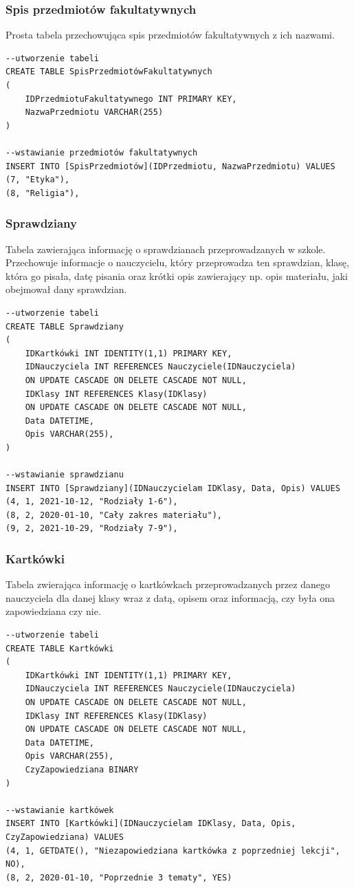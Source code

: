 \documentclass[60pt]{article}
\begin{document}
\subsubsection{Spis przedmiotów fakultatywnych}
Prosta tabela przechowująca spis przedmiotów fakultatywnych z ich nazwami.

 \begin{verbatim}
--utworzenie tabeli
CREATE TABLE SpisPrzedmiotówFakultatywnych
(
	IDPrzedmiotuFakultatywnego INT PRIMARY KEY,
	NazwaPrzedmiotu VARCHAR(255)
)

--wstawianie przedmiotów fakultatywnych
INSERT INTO [SpisPrzedmiotów](IDPrzedmiotu, NazwaPrzedmiotu) VALUES
(7, "Etyka"),
(8, "Religia"),
\end{verbatim}

 \subsubsection{Sprawdziany}
Tabela zawierająca informację o sprawdzianach przeprowadzanych w szkole. Przechowuje informacje o nauczycielu, który przeprowadza ten sprawdzian, klasę, która go pisała, datę pisania oraz krótki opis zawierający np. opis materiału, jaki obejmował dany sprawdzian.
 
\begin{verbatim}
--utworzenie tabeli
CREATE TABLE Sprawdziany
(
	IDKartkówki INT IDENTITY(1,1) PRIMARY KEY,
	IDNauczyciela INT REFERENCES Nauczyciele(IDNauczyciela) 
	ON UPDATE CASCADE ON DELETE CASCADE NOT NULL,
	IDKlasy INT REFERENCES Klasy(IDKlasy) 
	ON UPDATE CASCADE ON DELETE CASCADE NOT NULL,
	Data DATETIME,
	Opis VARCHAR(255),
)

--wstawianie sprawdzianu
INSERT INTO [Sprawdziany](IDNauczycielam IDKlasy, Data, Opis) VALUES
(4, 1, 2021-10-12, "Rodziały 1-6"), 
(8, 2, 2020-01-10, "Cały zakres materiału"),
(9, 2, 2021-10-29, "Rodziały 7-9"), 
\end{verbatim}

 \subsubsection{Kartkówki}
Tabela zwierająca informację o kartkówkach przeprowadzanych przez danego nauczyciela dla danej klasy wraz z datą, opisem oraz informacją, czy była ona zapowiedziana czy nie.
 
\begin{verbatim}
--utworzenie tabeli
CREATE TABLE Kartkówki
(
	IDKartkówki INT IDENTITY(1,1) PRIMARY KEY,
	IDNauczyciela INT REFERENCES Nauczyciele(IDNauczyciela) 
	ON UPDATE CASCADE ON DELETE CASCADE NOT NULL,
	IDKlasy INT REFERENCES Klasy(IDKlasy) 
	ON UPDATE CASCADE ON DELETE CASCADE NOT NULL,
	Data DATETIME,
	Opis VARCHAR(255),
	CzyZapowiedziana BINARY
)

--wstawianie kartkówek
INSERT INTO [Kartkówki](IDNauczycielam IDKlasy, Data, Opis, CzyZapowiedziana) VALUES
(4, 1, GETDATE(), "Niezapowiedziana kartkówka z poprzedniej lekcji", NO), 
(8, 2, 2020-01-10, "Poprzednie 3 tematy", YES)
\end{verbatim}
\end{document}
